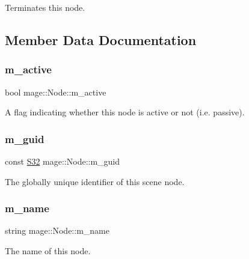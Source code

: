 Terminates this node. 

\subsection{Member Data Documentation}
\hypertarget{classmage_1_1_node_ac4dd6c399de8b2a92df92365df7ecdac}{}\label{classmage_1_1_node_ac4dd6c399de8b2a92df92365df7ecdac} 
\subsubsection{\texorpdfstring{m\+\_\+active}{m\_active}}
{\footnotesize\ttfamily bool mage\+::\+Node\+::m\+\_\+active\hspace{0.3cm}{\ttfamily [private]}}

A flag indicating whether this node is active or not (i.\+e. passive). \hypertarget{classmage_1_1_node_a4161df417f598841926264710ed7f7fd}{}\label{classmage_1_1_node_a4161df417f598841926264710ed7f7fd} 
\subsubsection{\texorpdfstring{m\+\_\+guid}{m\_guid}}
{\footnotesize\ttfamily const \hyperlink{namespacemage_a642e05c5c83642b6946703615cdbf2da}{S32} mage\+::\+Node\+::m\+\_\+guid\hspace{0.3cm}{\ttfamily [private]}}

The globally unique identifier of this scene node. \hypertarget{classmage_1_1_node_a476cc21fa65cdf9bde0f11fe08b5a707}{}\label{classmage_1_1_node_a476cc21fa65cdf9bde0f11fe08b5a707} 
\subsubsection{\texorpdfstring{m\+\_\+name}{m\_name}}
{\footnotesize\ttfamily string mage\+::\+Node\+::m\+\_\+name\hspace{0.3cm}{\ttfamily [private]}}

The name of this node. \hypertarget{classmage_1_1_node_aefb6986428c3dc24540af824a230b61d}{}\label{classmage_1_1_node_aefb6986428c3dc24540af824a230b61d} 
